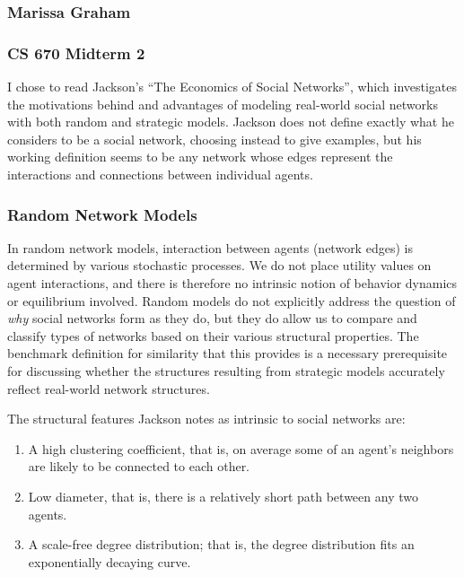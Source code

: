 \documentclass[11pt]{article}
\begin{document}
\subsubsection*{Marissa Graham}
\subsubsection*{CS 670 Midterm 2}

\vspace{0.5cm}


I chose to read Jackson's ``The Economics of Social Networks'', which investigates the motivations behind and advantages of modeling real-world social networks with both random and strategic models. Jackson does not define exactly what he considers to be a social network, choosing instead to give examples, but his working definition seems to be any network whose edges represent the interactions and connections between individual agents. 

\subsubsection*{Random Network Models}

In random network models, interaction between agents (network edges) is determined by various stochastic processes. We do not place utility values on agent interactions, and there is therefore no intrinsic notion of behavior dynamics or equilibrium involved. Random models do not explicitly address the question of \textit{why} social networks form as they do, but they do allow us to compare and classify types of networks based on their various structural properties. The benchmark definition for similarity that this provides is a necessary prerequisite for discussing whether the structures resulting from strategic models accurately reflect real-world network structures.

The structural features Jackson notes as intrinsic to social networks are:
\begin{enumerate}
\item A high clustering coefficient, that is, on average some of an agent's neighbors are likely to be connected to each other.
\item Low diameter, that is, there is a relatively short path between any two agents.
\item A scale-free degree distribution; that is, the degree distribution fits an exponentially decaying curve.
\end{enumerate}
\end{document}
